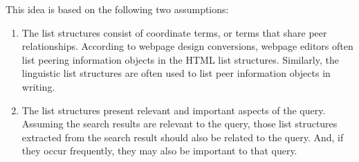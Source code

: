 This idea is based on the following two assumptions:
\begin{enumerate}[label={(\arabic*)}]
 \item The list structures consist of coordinate terms, or terms that share peer relationships. According to webpage design conversions, webpage editors often list peering information objects in the HTML list structures. Similarly, the linguistic list structures are often used to list peer information objects in writing.
 \item The list structures present relevant and important aspects of the query. Assuming the search results are relevant to the query, those list structures extracted from the search result should also be related to the query.  And, if they occur frequently, they may also be important to that query.
\end{enumerate}

